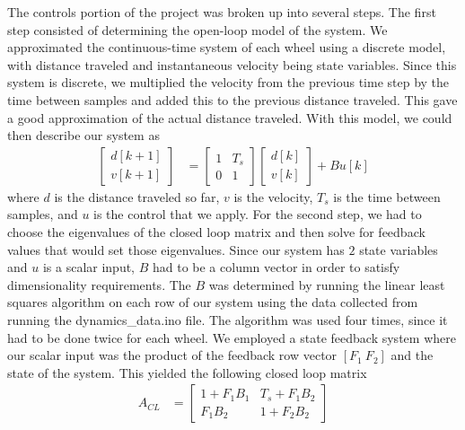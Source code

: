 \documentclass{article}
\begin{document}
The controls portion of the project was broken up into several steps. The first
step consisted of determining the open-loop model of the system. We
approximated the continuous-time system of each wheel using a discrete model,
with distance traveled and instantaneous velocity being state variables. Since
this system is discrete, we multiplied the velocity from the previous time step
by the time between samples and added this to the previous distance traveled.
This gave a good approximation of the actual distance traveled. With this
model, we could then describe our system as
\begin{align*}
  \begin{bmatrix}
    d[k+1] \\
    v[k+1]
  \end{bmatrix} &=
  \begin{bmatrix}
    1 & T_s \\
    0 & 1
  \end{bmatrix}
  \begin{bmatrix}
    d[k] \\
    v[k]
  \end{bmatrix} + B u[k]
\end{align*}
where $d$ is the distance
traveled so far, $v$ is the velocity, $T_s$ is the time between samples, and
$u$ is the control that we apply. For the second step, we had to choose the
eigenvalues of the closed loop matrix and then solve for feedback values that
would set those eigenvalues. Since our system has $2$ state variables and $u$
is a scalar input, $B$ had to be a column vector in order to satisfy
dimensionality requirements. The $B$ was determined by running the linear least
squares algorithm on each row of our system using the data collected from
running the dynamics\_data.ino file. The algorithm was used four times, since
it had to be done twice for each wheel. We employed a state feedback system
where our scalar input was the product of the feedback row vector $[F_1 \ F_2]$
and the state of the system. This yielded the following closed loop matrix
\begin{align*}
  A_{CL} &= \begin{bmatrix}
            1 + F_1 B_1 & T_s + F_1 B_2 \\
            F_1 B_2 & 1 + F_2 B_2
          \end{bmatrix}
\end{align*}
\end{document}
